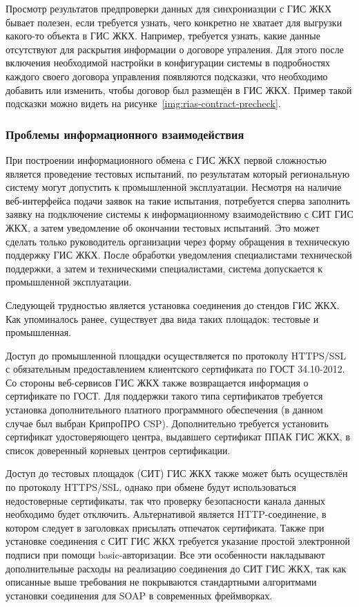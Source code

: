Просмотр результатов предпроверки данных для синхрониазции с ГИС ЖКХ бывает полезен, если требуется узнать, чего конкретно не хватает для выгрузки какого-то объекта в ГИС ЖКХ.
Например, требуется узнать, какие данные отсутствуют для раскрытия информации о договоре упраления.
Для этого после включения необходимой настройки в конфигурации системы в подробностях каждого своего договора управления появляются подсказки, что необходимо добавить или изменить, чтобы договор был размещён в ГИС ЖКХ.
Пример такой подсказки можно видеть на рисунке~\ref{img:rias-contract-precheck}.


\subsubsection{Проблемы информационного взаимодействия}

При построении информационного обмена с ГИС ЖКХ первой сложностью является проведение тестовых испытаний, по результатам который региональную систему могут допустить к промышленной эксплуатации.
Несмотря на наличие веб-интерфейса подачи заявок на такие испытания, потребуется сперва заполнить заявку на подключение системы к информационному взаимодействию с СИТ ГИС ЖКХ, а затем уведомление об окончании тестовых испытаний.
Это может сделать только руководитель организации через форму обращения в техническую поддержку ГИС ЖКХ.
После обработки уведомления специалистами технической поддержки, а затем и техническими специалистами, система допускается к промышленной эксплуатации.

Следующей трудностью является установка соединения до стендов ГИС ЖКХ.
Как упоминалось ранее, существует два вида таких площадок: тестовые и промышленная.

Доступ до промышленной площадки осуществляется по протоколу HTTPS/SSL с обязательным предоставлением клиентского сертификата по ГОСТ 34.10-2012.
Со стороны веб-сервисов ГИС ЖКХ также возвращается информация о сертификате по ГОСТ.
Для поддержки такого типа сертификатов требуется установка дополнительного платного программного обеспечения (в данном случае был выбран КрипроПРО CSP).
Дополнительно требуется установить сертификат удостоверяющего центра, выдавшего сертификат ППАК ГИС ЖКХ, в список доверенный корневых центров сертификации.

Доступ до тестовых площадок (СИТ) ГИС ЖКХ также может быть осуществлён по протоколу HTTPS/SSL, однако при обмене будут использоваться недостоверные сертификаты, так что проверку безопасности канала данных необходимо будет отключить.
Альтернативой является HTTP-соединение, в котором следует в заголовках присылать отпечаток сертификата.
Также при установке соединения с СИТ ГИС ЖКХ требуется указание простой электронной подписи при помощи basic-авторизации.
Все эти особенности накладывают дополнительные расходы на реализацию соединения до СИТ ГИС ЖКХ, так как описанные выше требования не покрываются стандартными алгоритмами установки соединения для SOAP в современных фреймворках.

